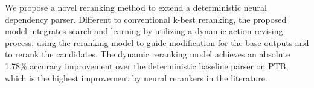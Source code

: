 We propose a novel reranking method to extend a deterministic neural dependency parser. Different to conventional k-best reranking, the proposed model integrates search and learning by utilizing a dynamic action revising process, using the reranking model to guide modification for the base outputs and to rerank the candidates. The dynamic reranking model achieves an absolute 1.78\% accuracy improvement over the deterministic baseline parser on PTB, which is the highest improvement by neural rerankers in the literature.
